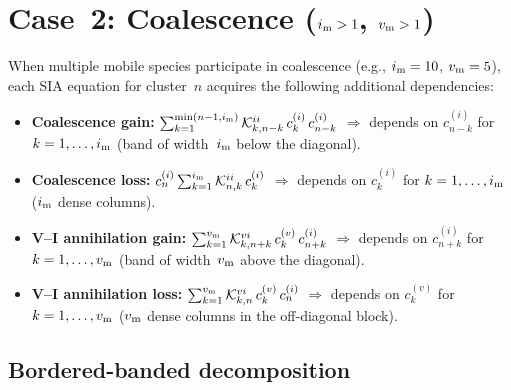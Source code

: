 \documentclass[11pt]{article}
\newcommand{\im}{i_{\rm m}}
\newcommand{\vm}{v_{\rm m}}
\newcommand{\Kii}{\mathcal{K}^{ii}}
\newcommand{\Kvi}{\mathcal{K}^{vi}}
\begin{document}
\section{Case~2: Coalescence ($\im > 1$, $\vm > 1$)}
\label{sec:coal}

When multiple mobile species participate in coalescence
(e.g., $\im = 10$, $\vm = 5$), each SIA equation for cluster~$n$
acquires the following additional dependencies:

\begin{itemize}
  \item \textbf{Coalescence gain:}
    $\sum_{k=1}^{\min(n-1,\im)} \Kii_{k,n-k}\,c_{k}^{(i)}\,c_{n-k}^{(i)}$
    $\Rightarrow$ depends on $c_{n-k}^{(i)}$ for $k = 1,\ldots,\im$
    (band of width~$\im$ below the diagonal).

  \item \textbf{Coalescence loss:}
    $c_{n}^{(i)}\sum_{k=1}^{\im} \Kii_{n,k}\,c_{k}^{(i)}$
    $\Rightarrow$ depends on $c_{k}^{(i)}$ for $k = 1,\ldots,\im$
    ($\im$ dense columns).

  \item \textbf{V--I annihilation gain:}
    $\sum_{k=1}^{\vm} \Kvi_{k,n+k}\,c_{k}^{(v)}\,c_{n+k}^{(i)}$
    $\Rightarrow$ depends on $c_{n+k}^{(i)}$ for $k = 1,\ldots,\vm$
    (band of width~$\vm$ above the diagonal).

  \item \textbf{V--I annihilation loss:}
    $\sum_{k=1}^{\vm} \Kvi_{k,n}\,c_{k}^{(v)}\,c_{n}^{(i)}$
    $\Rightarrow$ depends on $c_{k}^{(v)}$ for $k = 1,\ldots,\vm$
    ($\vm$ dense columns in the off-diagonal block).
\end{itemize}

\subsection{Bordered-banded decomposition}
\end{document}
